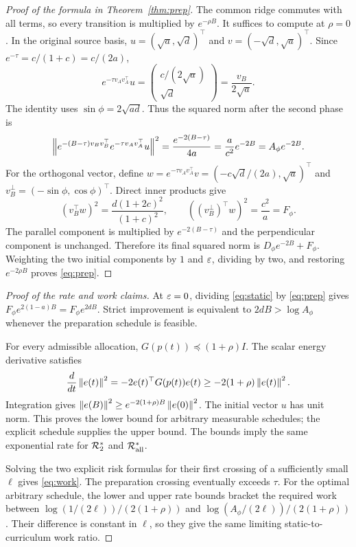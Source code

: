 \begin{proof}[Proof of the formula in Theorem~\ref{thm:prep}]
The common ridge commutes with all terms, so every transition is multiplied by $e^{-\rho B}$. It suffices to compute at $\rho=0$. In the original source basis, $u=(\sqrt a,\sqrt d)^\top$ and $v=(-\sqrt d,\sqrt a)^\top$. Since $e^{-\tau}=c/(1+c)=c/(2a)$,
\[
 e^{-\tau v_Av_A^\top}u
 =\begin{pmatrix}c/(2\sqrt a)\\\sqrt d\end{pmatrix}
 =\frac{v_B}{2\sqrt a}.
\]
The identity uses $\sin\phi=2\sqrt{ad}$. Thus the squared norm after the second phase is
\[
 \left\lVert e^{-(B-\tau)v_Bv_B^\top}e^{-\tau v_Av_A^\top}u\right\rVert^2
 =\frac{e^{-2(B-\tau)}}{4a}=\frac{a}{c^2}e^{-2B}=A_\phi e^{-2B}.
\]
For the orthogonal vector, define $w=e^{-\tau v_Av_A^\top}v=(-c\sqrt d/(2a),\sqrt a)^\top$ and $v_B^\perp=(-\sin\phi,\cos\phi)^\top$. Direct inner products give
\[
 (v_B^\top w)^2=\frac{d(1+2c)^2}{(1+c)^2},\qquad
 ((v_B^\perp)^\top w)^2=\frac{c^2}{a}=F_\phi.
\]
The parallel component is multiplied by $e^{-2(B-\tau)}$ and the perpendicular component is unchanged. Therefore its final squared norm is $D_\phi e^{-2B}+F_\phi$. Weighting the two initial components by $1$ and $\varepsilon$, dividing by two, and restoring $e^{-2\rho B}$ proves \eqref{eq:prep}.
\end{proof}

\begin{proof}[Proof of the rate and work claims]
At $\varepsilon=0$, dividing \eqref{eq:static} by \eqref{eq:prep} gives $F_\phi e^{2(1-a)B}=F_\phi e^{2dB}$. Strict improvement is equivalent to $2dB>\log A_\phi$ whenever the preparation schedule is feasible.

For every admissible allocation, $G(p(t))\preceq(1+\rho)I$. The scalar energy derivative satisfies
\[
 \frac{d}{dt}\left\lVert e(t)\right\rVert^2=-2e(t)^\top G(p(t))e(t)
 \ge-2(1+\rho)\left\lVert e(t)\right\rVert^2.
\]
Integration gives $\left\lVert e(B)\right\rVert^2\ge e^{-2(1+\rho)B}\left\lVert e(0)\right\rVert^2$. The initial vector $u$ has unit norm. This proves the lower bound for arbitrary measurable schedules; the explicit schedule supplies the upper bound. The bounds imply the same exponential rate for $\mathcal R_{2}^*$ and $\mathcal R_{\mathrm{all}}^*$.

Solving the two explicit risk formulas for their first crossing of a sufficiently small $\ell$ gives \eqref{eq:work}. The preparation crossing eventually exceeds $\tau$. For the optimal arbitrary schedule, the lower and upper rate bounds bracket the required work between $\log(1/(2\ell))/(2(1+\rho))$ and $\log(A_\phi/(2\ell))/(2(1+\rho))$. Their difference is constant in $\ell$, so they give the same limiting static-to-curriculum work ratio.
\end{proof}

